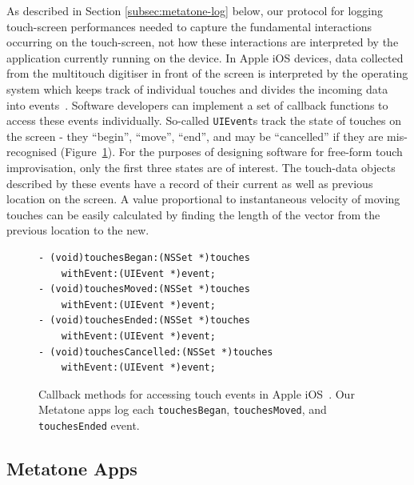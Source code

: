 \documentclass[graybox]{svmult}
\begin{document}
As described in Section \ref{subsec:metatone-log} below, our protocol for
logging touch-screen performances needed to capture the fundamental
interactions occurring on the touch-screen, not how these interactions
are interpreted by the application currently running on the device. In
Apple iOS devices, data collected from the multitouch digitiser in
front of the screen is interpreted by the operating system which keeps
track of individual touches and divides the incoming data into
events~\cite{AppleDeveloper:2015rm}. Software developers can implement
a set of callback functions to access these events individually.
So-called \texttt{UIEvent}s track the state of touches on the screen -
they ``begin'', ``move'', ``end'', and may be ``cancelled'' if they
are mis-recognised (Figure~\ref{touch-event-code-listing}). For the purposes of designing software for
free-form touch improvisation, only the first three states are of
interest. The touch-data objects described by these events have a
record of their current as well as previous location on the screen. A
value proportional to instantaneous velocity of moving touches can be
easily calculated by finding the length of the vector from the
previous location to the new.

\begin{figure}
\begin{verbatim}
- (void)touchesBegan:(NSSet *)touches 
    withEvent:(UIEvent *)event;
- (void)touchesMoved:(NSSet *)touches 
    withEvent:(UIEvent *)event;
- (void)touchesEnded:(NSSet *)touches 
    withEvent:(UIEvent *)event;
- (void)touchesCancelled:(NSSet *)touches 
    withEvent:(UIEvent *)event;
\end{verbatim}
  \caption{Callback methods for accessing touch events in Apple
    iOS~\cite{AppleDeveloper:2015rm}. Our Metatone apps log each
    \texttt{touchesBegan}, \texttt{touchesMoved}, and
    \texttt{touchesEnded} event.\label{touch-event-code-listing}}
\end{figure}

\subsection{Metatone Apps}
\label{subsec:metatone-apps}
\end{document}
